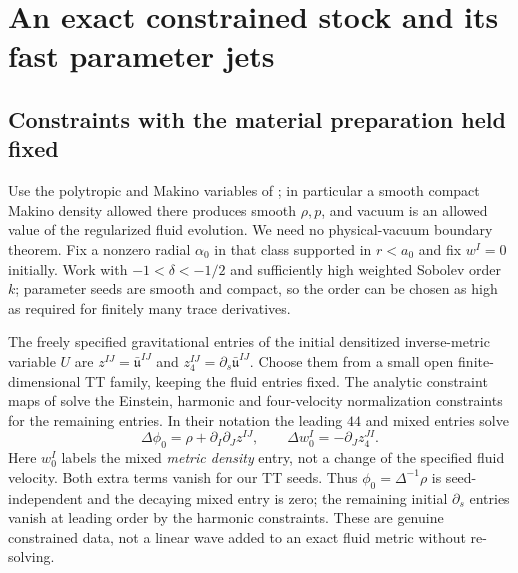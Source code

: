 \section{An exact constrained stock and its fast parameter jets}\label{sec:stock}

\subsection{Constraints with the material preparation held fixed}

Use the polytropic and Makino variables of \cite[Eqs.~(8)--(9), (29), (73)--(84)]{Oliynyk}; in particular a smooth compact Makino density allowed there produces smooth \(\rho,p\), and vacuum is an allowed value of the regularized fluid evolution. We need no physical-vacuum boundary theorem. Fix a nonzero radial \(\alpha_0\) in that class supported in \(r<a_0\) and fix \(w^I=0\) initially. Work with \(-1<\delta<-1/2\) and sufficiently high weighted Sobolev order \(k\); parameter seeds are smooth and compact, so the order can be chosen as high as required for finitely many trace derivatives.

The freely specified gravitational entries of the initial densitized inverse-metric variable \(U\) are \(z^{IJ}=\bar{\mathfrak u}^{IJ}\) and \(z_4^{IJ}=\partial_s\bar{\mathfrak u}^{IJ}\). Choose them from a small open finite-dimensional TT family, keeping the fluid entries fixed. The analytic constraint maps of \cite[Prop.~4.1]{Oliynyk} solve the Einstein, harmonic and four-velocity normalization constraints for the remaining entries. In their notation the leading \(44\) and mixed entries solve
\[
      \Delta\phi_0=\rho+\partial_I\partial_J z^{IJ},
      \qquad
      \Delta w^I_0=-\partial_J z_4^{JI}.
\]
Here \(w_0^I\) labels the mixed \emph{metric density} entry, not a change of the specified fluid velocity. Both extra terms vanish for our TT seeds. Thus \(\phi_0=\Delta^{-1}\rho\) is seed-independent and the decaying mixed entry is zero; the remaining initial \(\partial_s\) entries vanish at leading order by the harmonic constraints. These are genuine constrained data, not a linear wave added to an exact fluid metric without re-solving.

